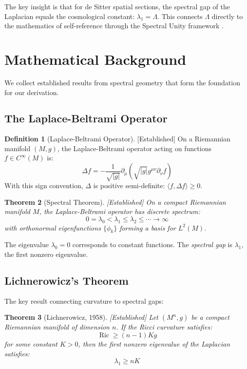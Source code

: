 \documentclass[11pt,a4paper]{article}
\theoremstyle{plain}
\newtheorem{theorem}{Theorem}[section]
\theoremstyle{definition}
\newtheorem{definition}[theorem]{Definition}
\theoremstyle{remark}
\newcommand{\Laplacian}{\Delta}
\newcommand{\ip}[2]{\langle #1, #2 \rangle}
\newcommand{\Ric}{\operatorname{Ric}}
\newcommand{\established}{\textcolor{green!50!black}{[Established]}}
\begin{document}
The key insight is that for de Sitter spatial sections, the spectral gap of the Laplacian equals the cosmological constant: $\lambda_1 = \Lambda$. This connects $\Lambda$ directly to the mathematics of self-reference through the Spectral Unity framework \cite{spectral_unity}.

\section{Mathematical Background}

We collect established results from spectral geometry that form the foundation for our derivation.

\subsection{The Laplace-Beltrami Operator}

\begin{definition}[Laplace-Beltrami Operator] \established
On a Riemannian manifold $(M, g)$, the Laplace-Beltrami operator acting on functions $f \in C^\infty(M)$ is:
\[
\Laplacian f = -\frac{1}{\sqrt{|g|}} \partial_\mu \left( \sqrt{|g|} g^{\mu\nu} \partial_\nu f \right)
\]
With this sign convention, $\Laplacian$ is positive semi-definite: $\ip{f}{\Laplacian f} \geq 0$.
\end{definition}

\begin{theorem}[Spectral Theorem] \established
\label{thm:spectral}
On a compact Riemannian manifold $M$, the Laplace-Beltrami operator has discrete spectrum:
\[
0 = \lambda_0 < \lambda_1 \leq \lambda_2 \leq \cdots \to \infty
\]
with orthonormal eigenfunctions $\{\phi_k\}$ forming a basis for $L^2(M)$.
\end{theorem}

The eigenvalue $\lambda_0 = 0$ corresponds to constant functions. The \emph{spectral gap} is $\lambda_1$, the first nonzero eigenvalue.

\subsection{Lichnerowicz's Theorem}

The key result connecting curvature to spectral gaps:

\begin{theorem}[Lichnerowicz, 1958] \established
\label{thm:lichnerowicz}
Let $(M^n, g)$ be a compact Riemannian manifold of dimension $n$. If the Ricci curvature satisfies:
\[
\Ric \geq (n-1) K g
\]
for some constant $K > 0$, then the first nonzero eigenvalue of the Laplacian satisfies:
\[
\lambda_1 \geq n K
\]
\end{theorem}
\end{document}
